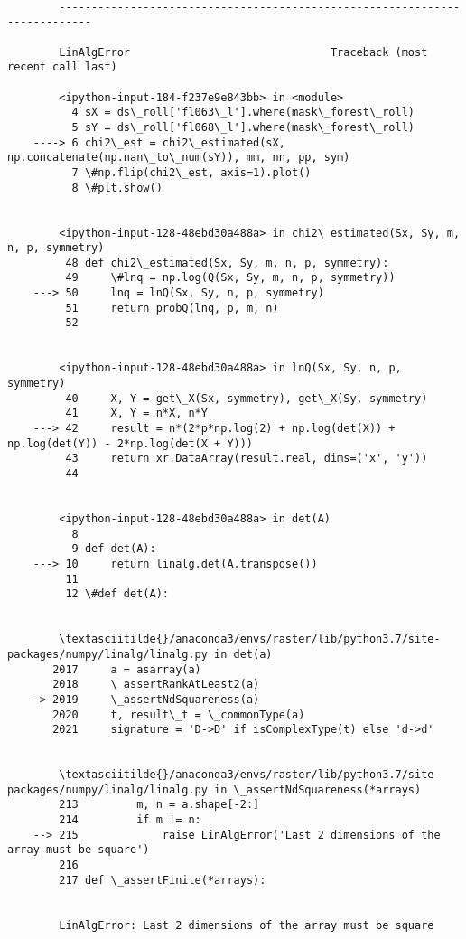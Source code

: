 \documentclass[11pt]{article}
\begin{document}
    \begin{Verbatim}[commandchars=\\\{\}]

        ---------------------------------------------------------------------------

        LinAlgError                               Traceback (most recent call last)

        <ipython-input-184-f237e9e843bb> in <module>
          4 sX = ds\_roll['fl063\_l'].where(mask\_forest\_roll)
          5 sY = ds\_roll['fl068\_l'].where(mask\_forest\_roll)
    ----> 6 chi2\_est = chi2\_estimated(sX, np.concatenate(np.nan\_to\_num(sY)), mm, nn, pp, sym)
          7 \#np.flip(chi2\_est, axis=1).plot()
          8 \#plt.show()


        <ipython-input-128-48ebd30a488a> in chi2\_estimated(Sx, Sy, m, n, p, symmetry)
         48 def chi2\_estimated(Sx, Sy, m, n, p, symmetry):
         49     \#lnq = np.log(Q(Sx, Sy, m, n, p, symmetry))
    ---> 50     lnq = lnQ(Sx, Sy, n, p, symmetry)
         51     return probQ(lnq, p, m, n)
         52 


        <ipython-input-128-48ebd30a488a> in lnQ(Sx, Sy, n, p, symmetry)
         40     X, Y = get\_X(Sx, symmetry), get\_X(Sy, symmetry)
         41     X, Y = n*X, n*Y
    ---> 42     result = n*(2*p*np.log(2) + np.log(det(X)) + np.log(det(Y)) - 2*np.log(det(X + Y)))
         43     return xr.DataArray(result.real, dims=('x', 'y'))
         44 


        <ipython-input-128-48ebd30a488a> in det(A)
          8 
          9 def det(A):
    ---> 10     return linalg.det(A.transpose())
         11 
         12 \#def det(A):


        \textasciitilde{}/anaconda3/envs/raster/lib/python3.7/site-packages/numpy/linalg/linalg.py in det(a)
       2017     a = asarray(a)
       2018     \_assertRankAtLeast2(a)
    -> 2019     \_assertNdSquareness(a)
       2020     t, result\_t = \_commonType(a)
       2021     signature = 'D->D' if isComplexType(t) else 'd->d'


        \textasciitilde{}/anaconda3/envs/raster/lib/python3.7/site-packages/numpy/linalg/linalg.py in \_assertNdSquareness(*arrays)
        213         m, n = a.shape[-2:]
        214         if m != n:
    --> 215             raise LinAlgError('Last 2 dimensions of the array must be square')
        216 
        217 def \_assertFinite(*arrays):


        LinAlgError: Last 2 dimensions of the array must be square

    \end{Verbatim}
\end{document}
